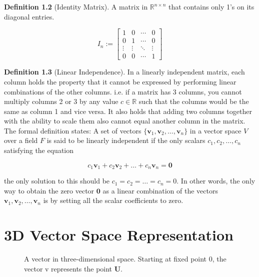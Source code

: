 \documentclass{report}
\begin{document}
\noindent \textbf{Definition 1.2} (Identity Matrix).
A matrix in $\mathbb{R}^{n \times n}$ that contains only 1's on its diagonal entries. 

\[ I_n := \begin{bmatrix} 
1 & 0 & \cdots & 0 \\
0 & 1 & \cdots & 0 \\
\vdots & \vdots & \ddots & \vdots \\
0 & 0 & \cdots & 1
\end{bmatrix} \]


\newpage
\noindent \textbf{Definition 1.3} (Linear Independence).
In a linearly independent matrix, each column holds the property that it cannot be expressed by performing linear combinations of the other columns. i.e. if a matrix has 3 columns, you cannot multiply columns 2 or 3 by any value $c \in \mathbb{R}$ such that the columns would be the same as column 1 and vice versa. It also holds that adding two columns together with the ability to scale them also cannot equal another column in the matrix. \\
The formal definition states: 
A set of vectors \( \{ \mathbf{v}_1, \mathbf{v}_2, \ldots, \mathbf{v}_n \} \) in a vector space \( V \) over a field \( F \) is said to be linearly independent if the only scalars \( c_1, c_2, \ldots, c_n \) satisfying the equation

\[ c_1 \mathbf{v}_1 + c_2 \mathbf{v}_2 + \ldots + c_n \mathbf{v}_n = \mathbf{0} \]

the only solution to this should be \( c_1 = c_2 = \ldots = c_n = 0 \). In other words, the only way to obtain the zero vector \( \mathbf{0} \) as a linear combination of the vectors \( \mathbf{v}_1, \mathbf{v}_2, \ldots, \mathbf{v}_n \) is by setting all the scalar coefficients to zero.

\section{3D Vector Space Representation}

\begin{figure}[h]
    \centering
    \caption{A vector in three-dimensional space. Starting at fixed point 0, the vector v represents the point $\mathbf{U}$.}
    \label{fig:vector_diagram}
\end{figure}
\end{document}
